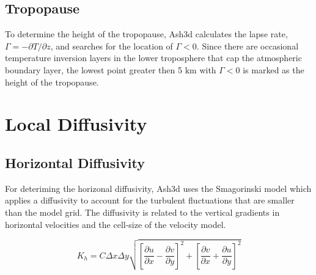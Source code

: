 \subsection{Tropopause}
To determine the height of the tropopause, Ash3d calculates the lapse rate,
$\Gamma = -\partial T/\partial z$, and searches for the location of $\Gamma<0$.
Since there are occasional temperature inversion layers in the lower troposphere
that cap the atmospheric boundary layer,
the lowest point greater then 5 $\mathrm{km}$ with $\Gamma<0$ is marked as the
height of the tropopause.





\section{Local Diffusivity}
\subsection{Horizontal Diffusivity}\label{ChapAppendVarDiff_Sec_Kh}
For deteriming the horizonal diffusivity, Ash3d uses the Smagorinski model which
applies a diffusivity to account for the turbulent fluctuations that are smaller
than the model grid. The diffusivity is related to the vertical gradients in
horizontal velocities and the cell-size of the velocity model.

\begin{equation}\label{VarDiff_Eq_Smag}
K_h = C \Delta x \Delta y \sqrt{\left[ \frac{\partial u}{\partial x} -\frac{\partial v}{\partial y} \right]^2
+ \left[ \frac{\partial v}{\partial x} +\frac{\partial u}{\partial y} \right]^2}
\end{equation}


